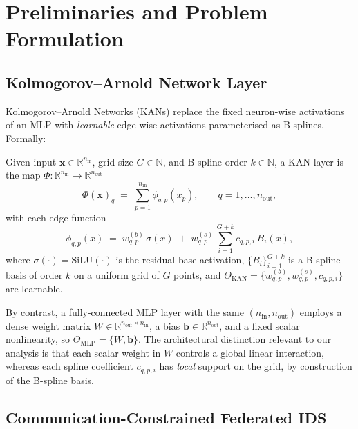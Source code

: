 \section{Preliminaries and Problem Formulation}\label{sec:prelim}

\subsection{Kolmogorov--Arnold Network Layer}

Kolmogorov--Arnold Networks (KANs) \cite{liu2024kan} replace the fixed neuron-wise activations of an MLP with \emph{learnable} edge-wise activations parameterised as B-splines. Formally:

\begin{definition}\label{def:kan}
Given input $\mathbf{x} \in \mathbb{R}^{n_{\text{in}}}$, grid size $G \in \mathbb{N}$, and B-spline order $k \in \mathbb{N}$, a KAN layer is the map $\Phi: \mathbb{R}^{n_{\text{in}}} \to \mathbb{R}^{n_{\text{out}}}$
\begin{equation}
\Phi(\mathbf{x})_q \;=\; \sum_{p=1}^{n_{\text{in}}} \phi_{q,p}(x_p), \qquad q = 1, \ldots, n_{\text{out}},
\end{equation}
with each edge function
\begin{equation}\label{eq:edge}
\phi_{q,p}(x) \;=\; w^{(b)}_{q,p}\, \sigma(x) \;+\; w^{(s)}_{q,p}\, \sum_{i=1}^{G+k} c_{q,p,i}\, B_i(x),
\end{equation}
where $\sigma(\cdot) = \mathrm{SiLU}(\cdot)$ is the residual base activation, $\{B_i\}_{i=1}^{G+k}$ is a B-spline basis of order $k$ on a uniform grid of $G$ points, and $\Theta_{\text{KAN}} = \{w^{(b)}_{q,p}, w^{(s)}_{q,p}, c_{q,p,i}\}$ are learnable.
\end{definition}

By contrast, a fully-connected MLP layer with the same $(n_{\text{in}}, n_{\text{out}})$ employs a dense weight matrix $W \in \mathbb{R}^{n_{\text{out}} \times n_{\text{in}}}$, a bias $\mathbf{b} \in \mathbb{R}^{n_{\text{out}}}$, and a fixed scalar nonlinearity, so $\Theta_{\text{MLP}} = \{W, \mathbf{b}\}$. The architectural distinction relevant to our analysis is that each scalar weight in $W$ controls a global linear interaction, whereas each spline coefficient $c_{q,p,i}$ has \emph{local} support on the grid, by construction of the B-spline basis.

\subsection{Communication-Constrained Federated IDS}

